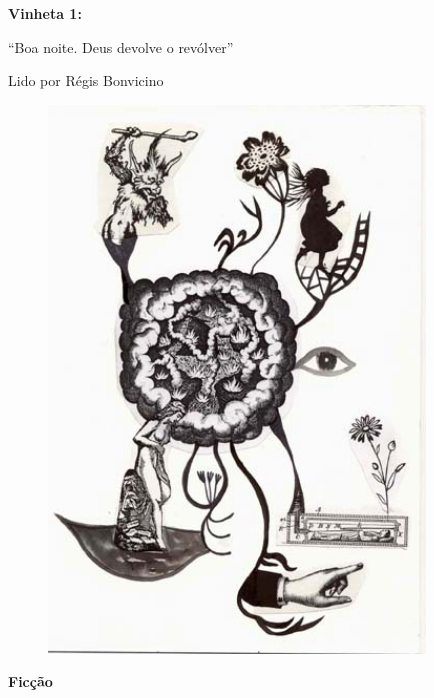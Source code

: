 \pagebreak
\begin{absolutelynopagebreak}
\textbf{Vinheta 1:}

``Boa noite. Deus devolve o revólver''

Lido por Régis Bonvicino


\thispagestyle{empty}

\begin{vplace}
\begin{figure}[H]
  \centering
  \vspace*{4cm}
  \includegraphics[width=100mm]{./imgs/caparc1.JPG}  

\end{figure}
\end{vplace}

\end{absolutelynopagebreak}

\pagebreak

\textbf{Ficção}

